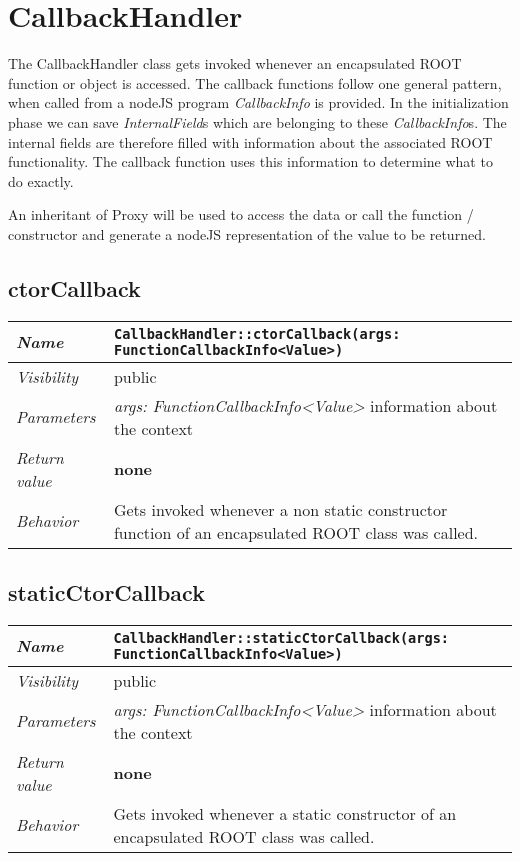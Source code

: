 \chapter{CallbackHandler}
The CallbackHandler class gets invoked whenever an encapsulated ROOT function or object is accessed.
The callback functions follow one general pattern, when called from a nodeJS program \textit{CallbackInfo} is provided.
In the initialization phase we can save \textit{InternalField}s which are belonging to these \textit{CallbackInfo}s.
The internal fields are therefore filled with information about the associated ROOT functionality.
The callback function uses this information to determine what to do exactly.

An inheritant of Proxy will be used to access the data or call the function / constructor and generate a nodeJS representation of the value to be returned.
\section{ctorCallback}
\begin{longtable}{p{3cm} @{\hskip 1cm} p{12cm}}
 \hline
\textit{Name} & \texttt{CallbackHandler::ctorCallback(args: FunctionCallbackInfo<Value>)}\\
\hline
 \textit{Visibility} & public\\
\hline
\textit{Parameters} & \textit{args: FunctionCallbackInfo<Value>} information about the context\\
\hline
\textit{Return value} & \textbf{none}\\
  \hline
 \textit{Behavior} & Gets invoked whenever a non static constructor function of an encapsulated ROOT class was called.\\
\hline
\end{longtable}
 \section{staticCtorCallback}
\begin{longtable}{p{3cm} @{\hskip 1cm} p{12cm}}
 \hline
\textit{Name} & \texttt{CallbackHandler::staticCtorCallback(args: FunctionCallbackInfo<Value>)}\\
\hline
 \textit{Visibility} & public\\
\hline
\textit{Parameters} & \textit{args: FunctionCallbackInfo<Value>} information about the context\\
\hline
\textit{Return value} & \textbf{none}\\
  \hline
 \textit{Behavior} & Gets invoked whenever a static constructor of an encapsulated ROOT class was called.\\
\hline
\end{longtable}\pagebreak
